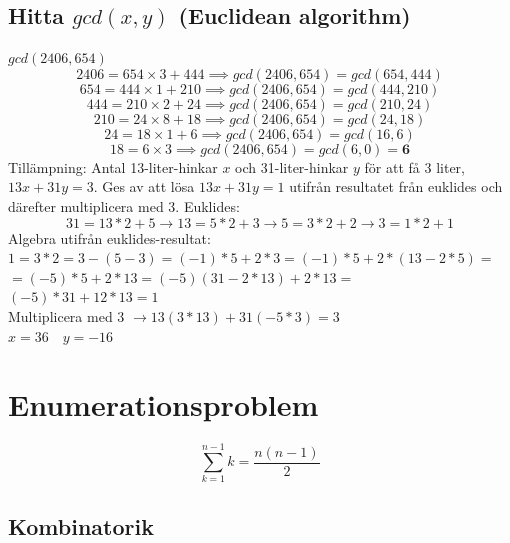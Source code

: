 \documentclass{article}
\begin{document}
\begin{multicols}{2}
\subsection{Hitta $gcd(x,y)$ (Euclidean algorithm)}\label{euclid}
$gcd(2406,654)$
$$2406 = 654 \times 3 + 444 \implies gcd(2406,654) = gcd(654,444)$$
$$654 = 444 \times 1 + 210 \implies gcd(2406,654) = gcd(444,210)$$
$$444 = 210 \times 2 + 24 \implies gcd(2406,654) = gcd(210,24)$$
$$210 = 24 \times 8 + 18 \implies gcd(2406,654) = gcd(24,18)$$
$$24 = 18 \times 1 + 6 \implies gcd(2406,654) = gcd(16,6)$$
$$18 = 6 \times 3 \implies gcd(2406,654) = gcd(6,0) = \textbf{6}$$
\newline
Tillämpning: Antal 13-liter-hinkar $x$ och 31-liter-hinkar $y$ för att få 3 liter, $13x+31y=3$. Ges av att lösa $13x+31y=1$ utifrån resultatet från euklides och därefter multiplicera med 3. Euklides:
$$31=13*2+5 \rightarrow 13=5*2+3 \rightarrow 5=3*2+2 \rightarrow 3=1*2+1$$
Algebra utifrån euklides-resultat:\\
$1=3*2=3-(5-3)=(-1)*5+2*3=(-1)*5+2*(13-2*5)=$\\
$=(-5)*5+2*13=(-5)(31-2*13)+2*13=$\\
$(-5)*31+12*13=1$\\ 
Multiplicera med 3 $\rightarrow 13(3*13)+31(-5*3)=3$\\
$x=36 \quad y=-16$

\section{Enumerationsproblem}
$$\sum_{k=1}^{n-1} k = \frac{n(n-1)}{2}$$

\subsection{Kombinatorik}
\end{multicols}
\end{document}

